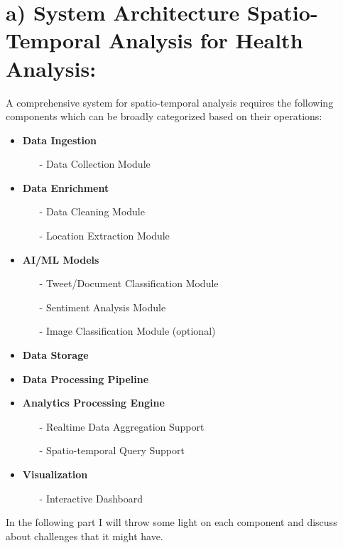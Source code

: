\section{ a) System Architecture  Spatio-Temporal Analysis for Health Analysis:}
\label{part_a}
A comprehensive system for spatio-temporal analysis requires the following components which can be broadly categorized based on their operations:

\begin{itemize}
  \item \textbf{Data Ingestion}
    {\em
    \begin{itemize}
      \item[-] Data Collection Module
    \end{itemize}
    }
  \item \textbf{Data Enrichment}
    {\em
    \begin{itemize}
    \item[-] Data Cleaning Module
    \item[-] Location Extraction Module
    \end{itemize}
    }
  \item \textbf{AI/ML Models}
    {\em
    \begin{itemize}
      \item[-] Tweet/Document Classification Module
      \item[-] Sentiment Analysis Module
      \item[-] Image Classification Module (optional)
    \end{itemize}
    }
  \item \textbf{Data Storage}
  \item \textbf{Data Processing Pipeline}
  \item \textbf{Analytics Processing Engine}
    {\em
    \begin{itemize}
      \item[-] Realtime Data Aggregation Support
      \item[-] Spatio-temporal Query Support
    \end{itemize}
    }
  \item \textbf{Visualization}
    {\em
    \begin{itemize}
      \item[-] Interactive Dashboard
    \end{itemize}
    }
\end{itemize}

In the following part I will throw some light on each component and discuss about challenges that it might have.

